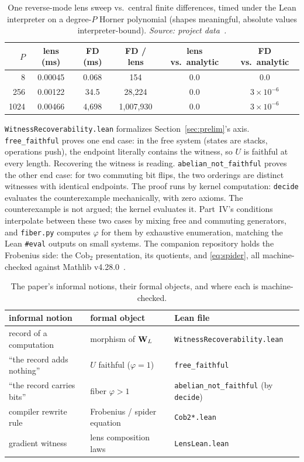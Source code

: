 \begin{table}[htbp]
\centering\footnotesize
\caption{One reverse-mode lens sweep vs.\ central finite differences, timed under the Lean interpreter on a degree-$P$ Horner polynomial (shapes meaningful, absolute values interpreter-bound). \emph{Source: project data~\cite{appliedrepo2026}.}}
\label{tab:lensbench}
\begin{tabular}{rccccc}
\toprule
$P$ & lens (ms) & FD (ms) & FD / lens & lens vs.\ analytic & FD vs.\ analytic \\
\midrule
8 & 0.00045 & 0.068 & 154 & 0.0 & 0.0 \\
256 & 0.00122 & 34.5 & 28{,}224 & 0.0 & $3\times10^{-6}$ \\
1024 & 0.00466 & 4{,}698 & 1{,}007{,}930 & 0.0 & $3\times10^{-6}$ \\
\bottomrule
\end{tabular}
\end{table}

\texttt{WitnessRecoverability.lean} formalizes Section~\ref{sec:prelim}'s axis. \texttt{free\_faithful} proves one end case: in the free system (states are stacks, operations push), the endpoint literally contains the witness, so $U$ is faithful at every length. Recovering the witness is reading. \texttt{abelian\_not\_faithful} proves the other end case: for two commuting bit flips, the two orderings are distinct witnesses with identical endpoints. The proof runs by kernel computation: \texttt{decide} evaluates the counterexample mechanically, with zero axioms. The counterexample is not argued; the kernel evaluates it. Part~IV's conditions interpolate between these two cases by mixing free and commuting generators, and \texttt{fiber.py} computes $\varphi$ for them by exhaustive enumeration, matching the Lean \texttt{\#eval} outputs on small systems. The companion repository holds the Frobenius side: the $\mathrm{Cob}_2$ presentation, its quotients, and \eqref{eq:spider}, all machine-checked against Mathlib v4.28.0~\cite{liquidtqft2026}.

\begin{table}[htbp]
\centering\footnotesize
\caption{The paper's informal notions, their formal objects, and where each is machine-checked.}
\label{tab:map}
\begin{tabular}{@{}lll@{}}
\toprule
informal notion & formal object & Lean file \\
\midrule
record of a computation & morphism of $\mathbf{W}_L$ & \texttt{WitnessRecoverability.lean} \\
``the record adds nothing'' & $U$ faithful ($\varphi = 1$) & \texttt{free\_faithful} \\
``the record carries bits'' & fiber $\varphi > 1$ & \texttt{abelian\_not\_faithful} (by \texttt{decide}) \\
compiler rewrite rule & Frobenius / spider equation & \texttt{Cob2*.lean}~\cite{liquidtqft2026} \\
gradient witness & lens composition laws & \texttt{LensLean.lean} \\
\bottomrule
\end{tabular}
\end{table}

